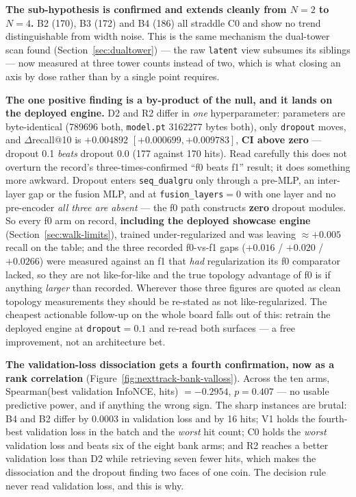 \documentclass[11pt]{article}
\begin{document}
\textbf{The sub-hypothesis is confirmed and extends cleanly from $N=2$ to
$N=4$.} B2 (\num{170}), B3 (\num{172}) and B4 (\num{186}) all straddle C0 and
show no trend distinguishable from width noise. This is the same mechanism the
dual-tower scan found (Section~\ref{sec:dualtower}) --- the raw \texttt{latent}
view subsumes its siblings --- now measured at three tower counts instead of two,
which is what closing an axis by dose rather than by a single point requires.

\textbf{The one positive finding is a by-product of the null, and it lands on the
deployed engine.} D2 and R2 differ in \emph{one} hyperparameter: parameters are
byte-identical (\num{789696} both, \texttt{model.pt} \num{3162277} bytes both),
only \texttt{dropout} moves, and $\Delta$recall@10 is $+\num{0.004892}$
$[+\num{0.000699},+\num{0.009783}]$, \textbf{CI above zero} --- dropout
\num{0.1} \emph{beats} dropout \num{0.0} (\num{177} against \num{170} hits).
Read carefully this does not overturn the record's three-times-confirmed ``f0
beats f1'' result; it does something more awkward. Dropout enters
\texttt{seq\_dualgru} only through a pre-MLP, an inter-layer gap or the fusion
MLP, and at \texttt{fusion\_layers}${}=0$ with one layer and no pre-encoder
\emph{all three are absent} --- the f0 path constructs \textbf{zero} dropout
modules. So every f0 arm on record, \textbf{including the deployed showcase
engine} (Section~\ref{sec:walk-limits}), trained under-regularized and was
leaving ${\approx}+\num{0.005}$ recall on the table; and the three recorded
f0-vs-f1 gaps ($+\num{0.016}$ / $+\num{0.020}$ / $+\num{0.0266}$) were measured
against an f1 that \emph{had} regularization its f0 comparator lacked, so they
are not like-for-like and the true topology advantage of f0 is if anything
\emph{larger} than recorded. Wherever those three figures are quoted as clean
topology measurements they should be re-stated as not like-regularized. The
cheapest actionable follow-up on the whole board falls out of this: retrain the
deployed engine at \texttt{dropout}${}=\num{0.1}$ and re-read both surfaces ---
a free improvement, not an architecture bet.

\textbf{The validation-loss dissociation gets a fourth confirmation, now as a
rank correlation} (Figure~\ref{fig:nexttrack-bank-valloss}). Across the ten arms,
Spearman(best validation InfoNCE, hits) $=-\num{0.2954}$, $p=\num{0.407}$ --- no
usable predictive power, and if anything the wrong sign. The sharp instances are
brutal: B4 and B2 differ by \num{0.0003} in validation loss and by \num{16}
hits; V1 holds the fourth-best validation loss in the batch and the \emph{worst}
hit count; C0 holds the \emph{worst} validation loss and beats six of the eight
bank arms; and R2 reaches a better validation loss than D2 while retrieving seven
fewer hits, which makes the dissociation and the dropout finding two faces of one
coin. The decision rule never read validation loss, and this is why.
\end{document}
